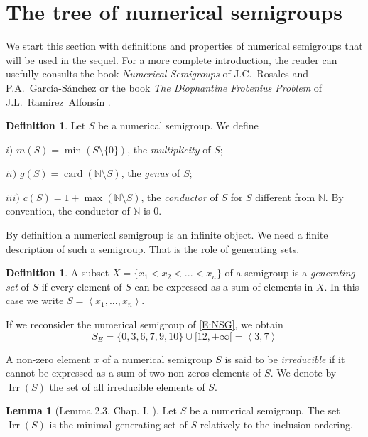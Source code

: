 \documentclass[reqno,11pt]{amsart}
\theoremstyle{plain}
\theoremstyle{definition}
\newtheorem{defi}[prop]{Definition}
\newtheorem{lem}[prop]{Lemma}
\newcommand{\NN}{\mathbb{N}}
\DeclareMathOperator{\Irr}{Irr}
\DeclareMathOperator{\card}{card}
\begin{document}
\section{The tree of numerical semigroups}
\label{S:Tree}

We start this section with definitions and properties of numerical semigroups that will be used in the sequel.
For a more complete introduction, the reader can usefully consults the book \emph{Numerical Semigroups} of J.C.~Rosales and P.A.~Garc\'ia-S\'anchez \cite{BookNS} or the book \emph{The Diophantine Frobenius Problem} of J.L.~Ram\'irez~Alfons\'in \cite{BookDFP}.

\begin{defi}
Let $S$ be a numerical semigroup. We define 

$i)$ $m(S)=\min(S\setminus\{0\})$, the \emph{multiplicity} of $S$;

$ii)$ $g(S)=\card(\NN\setminus S)$, the \emph{genus} of $S$;

$iii)$ $c(S)=1+\max(\NN\setminus S)$, the \emph{conductor} of $S$ for $S$ different from $\NN$. By convention, the conductor of $\NN$ is $0$. 
\end{defi}

By definition a numerical semigroup is an infinite object. 
We need a finite description of such a semigroup. 
That is the role of generating sets.


\begin{defi}
A subset $X=\{x_1<x_2<...<x_n\}$ of a semigroup is a \emph{generating set} of $S$ if every element of $S$ can be expressed as a sum of elements in $X$. 
In this case we write $S=\left<x_1,...,x_n\right>$.
\end{defi}

If we reconsider the numerical semigroup of \eqref{E:NSG}, we obtain
\begin{equation}
\label{E:GNSG}
S_E=\{0,3,6,7,9,10\}\cup[12,+\infty[=\left<3,7\right>
\end{equation}


A non-zero element $x$ of a numerical semigroup $S$ is said to be \emph{irreducible} if it cannot be expressed as a sum of two non-zeros elements of $S$.  
We denote by $\Irr(S)$ the set of all irreducible elements of $S$.

\begin{lem}[Lemma 2.3, Chap. I, \cite{BookNS}]
Let $S$ be a numerical semigroup. The set $\Irr(S)$ is the minimal generating set of $S$ relatively to the inclusion ordering.
\end{lem} 
\end{document}

